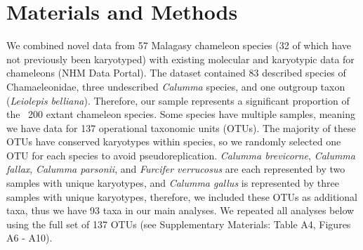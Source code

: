 \documentclass[a4paper, 12pt]{article}
\begin{document}
\section{Materials and Methods}

We combined novel data from 57 Malagasy chameleon species (32 of which have not previously been karyotyped) with existing molecular and karyotypic data for chameleons (NHM Data Portal\cite{chameleon-data}). 
The dataset contained 83 described species of Chamaeleonidae, three undescribed \textit{Calumma} species, and one outgroup taxon (\textit{Leiolepis belliana}). 
Therefore, our sample represents a significant proportion of the ~200 extant chameleon species\cite{uetz2022}. 
Some species have multiple samples, meaning we have data for 137 operational taxonomic units (OTUs). 
The majority of these OTUs have conserved karyotypes within species, so we randomly selected one OTU for each species to avoid pseudoreplication.
\textit{Calumma brevicorne}, \textit{Calumma fallax}, \textit{Calumma parsonii}, and \textit{Furcifer verrucosus} are each represented by two samples with unique karyotypes, and \textit{Calumma gallus} is represented by three samples with unique karyotypes, therefore, we included these OTUs as additional taxa, thus we have 93 taxa in our main analyses. 
We repeated all analyses below using the full set of 137 OTUs (see Supplementary Materials: Table A4, Figures A6 - A10).
\end{document}
